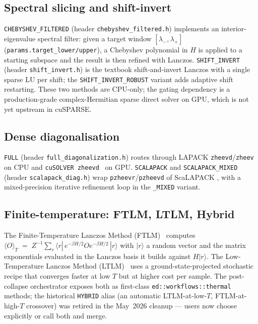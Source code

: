 \documentclass[submission, PhysCodeb]{SciPost}
\begin{document}
\subsection{Spectral slicing and shift-invert}
\texttt{CHEBYSHEV\_FILTERED} (header \texttt{chebyshev\_filtered.h})
implements an interior-eigenvalue spectral filter: given a target
window $[\lambda_-,\lambda_+]$ (\texttt{params.target\_lower/upper}),
a Chebyshev polynomial in $H$ is applied to a starting subspace and
the result is then refined with Lanczos. \texttt{SHIFT\_INVERT}
(header \texttt{shift\_invert.h}) is the textbook shift-and-invert
Lanczos with a single sparse LU per shift; the
\texttt{SHIFT\_INVERT\_ROBUST} variant adds adaptive shift
restarting. These two methods are CPU-only; the gating dependency is
a production-grade complex-Hermitian sparse direct solver on GPU,
which is not yet upstream in cuSPARSE.

\subsection{Dense diagonalisation}
\texttt{FULL} (header \texttt{full\_diagonalization.h}) routes through
LAPACK \texttt{zheevd}/\texttt{zheev}~\cite{Anderson1999LAPACK} on
CPU and \texttt{cuSOLVER zheevd}~\cite{NVIDIAcuSOLVER} on GPU.
\texttt{SCALAPACK} and \texttt{SCALAPACK\_MIXED} (header
\texttt{scalapack\_diag.h}) wrap \texttt{pzheevr}/\texttt{pzheevd} of
ScaLAPACK \cite{Blackford1997ScaLAPACK,Choi1996ScaLAPACKDesign}, with
a mixed-precision iterative refinement loop in the
\texttt{\_MIXED} variant.

\subsection{Finite-temperature: FTLM, LTLM, Hybrid}
The Finite-Temperature Lanczos Method
(FTLM)~\cite{Jaklic1994FTLM} computes
$\langle O \rangle_T \;=\; Z^{-1}\sum_r \langle r |\,e^{-\beta H/2}
O e^{-\beta H/2}\,|r\rangle$
with $|r\rangle$ a random vector and the matrix exponentials evaluated
in the Lanczos basis it builds against $H |r\rangle$. The
Low-Temperature Lanczos Method (LTLM)~\cite{Aichhorn2003LTLM} uses a
ground-state-projected stochastic recipe that converges faster at
low $T$ but at higher cost per sample. The post-collapse orchestrator
exposes both as first-class \texttt{ed::workflows::thermal} methods;
the historical \texttt{HYBRID} alias (an automatic LTLM-at-low-$T$,
FTLM-at-high-$T$ crossover) was retired in the May~2026 cleanup ---
users now choose explicitly or call both and merge.
\end{document}
